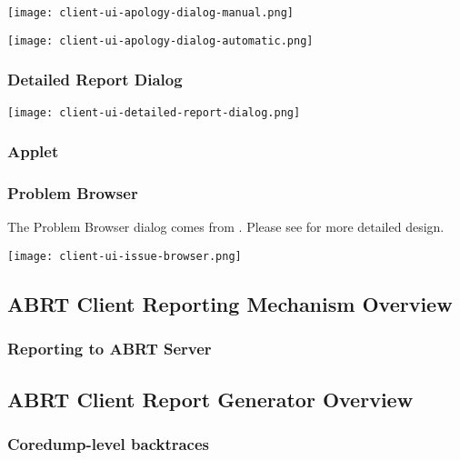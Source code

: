 \documentclass{article}
\begin{document}
\begin{center}
\texttt{[image: client-ui-apology-dialog-manual.png]}
\end{center}

\begin{center}
\texttt{[image: client-ui-apology-dialog-automatic.png]}
\end{center}

\subsubsection{Detailed Report Dialog}
\begin{center}
\texttt{[image: client-ui-detailed-report-dialog.png]}
\end{center}

\subsubsection{Applet}

\cleardoublepage
\subsubsection{Problem Browser}
The Problem Browser dialog comes from \cite{JonOops}. Please see
\cite{JonOops} for more detailed design.

\begin{center}
\texttt{[image: client-ui-issue-browser.png]}
\end{center}

\subsection{ABRT Client Reporting Mechanism Overview}

\subsubsection{Reporting to ABRT Server}

\subsection{ABRT Client Report Generator Overview}

\subsubsection{Coredump-level backtraces}
\end{document}
